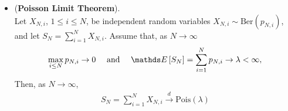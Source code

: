 \documentclass[11pt]{article}
\begin{document}
\begin{itemize}
\item \begin{theorem} (\textbf{Poisson Limit Theorem}).   \citep{vershynin2018high} \\
Let $X_{N,i}$, $1 \le i \le N$, be independent random variables $X_{N,i} \sim \text{Ber}(p_{N,i})$, and let $S_N = \sum^{N}_{i=1}X_{N,i}$. Assume that, as $N \to \infty$
\begin{align*}
\max_{i\le N}p_{N,i} \rightarrow 0\quad  \text{ and }\quad \E{}{S_N} = \sum^{N}_{i=1}p_{N,i} \rightarrow \lambda < \infty,
\end{align*}
Then, as $N \to \infty$,
\begin{align*}
S_N =  \sum^{N}_{i=1}X_{N,i} \stackrel{d}{\rightarrow} \text{Pois}(\lambda)
\end{align*}
\end{theorem}
\end{itemize}
\end{document}
